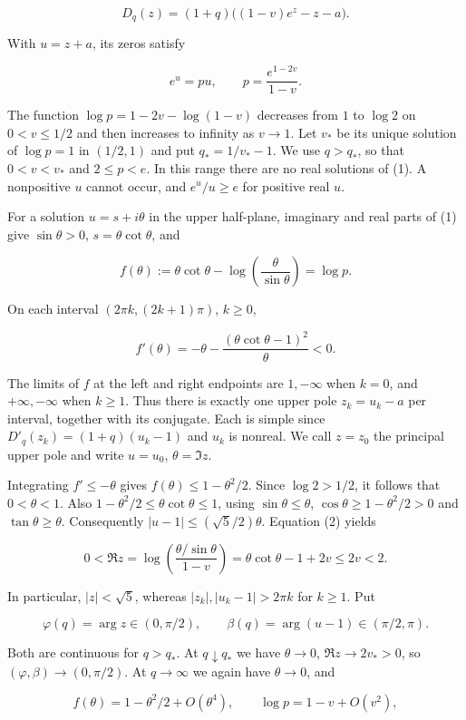 \documentclass[11pt]{article}
\begin{document}
\[
D_q(z)=(1+q)\big((1-v)e^z-z-a\big).
\]

With $u=z+a$, its zeros satisfy

\[
e^u=p u,\qquad p=\frac{e^{1-2v}}{1-v}.
\tag{1}
\]

The function $\log p=1-2v-\log(1-v)$ decreases from $1$ to $\log 2$ on $0<v\le1/2$ and then increases to infinity as $v\to1$. Let $v_*$ be its unique solution of $\log p=1$ in $(1/2,1)$ and put $q_*=1/v_*-1$. We use $q>q_*$, so that $0<v<v_*$ and $2\le p<e$. In this range there are no real solutions of (1). A nonpositive $u$ cannot occur, and $e^u/u\ge e$ for positive real $u$.

For a solution $u=s+i\theta$ in the upper half-plane, imaginary and real parts of (1) give $\sin\theta>0$, $s=\theta\cot\theta$, and

\[
f(\theta):=\theta\cot\theta-\log\left(\frac\theta{\sin\theta}\right)=\log p.
\tag{2}
\]

On each interval $(2\pi k,(2k+1)\pi)$, $k\ge0$,

\[
f'(\theta)=-\theta-\frac{(\theta\cot\theta-1)^2}{\theta}<0.
\]

The limits of $f$ at the left and right endpoints are $1,-\infty$ when $k=0$, and $+\infty,-\infty$ when $k\ge1$. Thus there is exactly one upper pole $z_k=u_k-a$ per interval, together with its conjugate. Each is simple since $D'_q(z_k)=(1+q)(u_k-1)$ and $u_k$ is nonreal. We call $z=z_0$ the principal upper pole and write $u=u_0$, $\theta=\Im z$.

Integrating $f'\le-\theta$ gives $f(\theta)\le 1-\theta^2/2$. Since $\log 2>1/2$, it follows that $0<\theta<1$. Also $1-\theta^2/2\le\theta\cot\theta\le1$, using $\sin\theta\le\theta$, $\cos\theta\ge1-\theta^2/2>0$ and $\tan\theta\ge\theta$. Consequently $|u-1|\le(\sqrt5/2)\theta$. Equation (2) yields

\[
0<\Re z=\log\left(\frac{\theta/\sin\theta}{1-v}\right)
=\theta\cot\theta-1+2v\le2v<2.
\]

In particular, $|z|<\sqrt5$, whereas $|z_k|,|u_k-1|>2\pi k$ for $k\ge1$. Put

\[
\varphi(q)=\arg z\in(0,\pi/2),\qquad \beta(q)=\arg(u-1)\in(\pi/2,\pi).
\]

Both are continuous for $q>q_*$. At $q\downarrow q_*$ we have $\theta\to0$, $\Re z\to2v_*>0$, so $(\varphi,\beta)\to(0,\pi/2)$. At $q\to\infty$ we again have $\theta\to0$, and

\[
f(\theta)=1-\theta^2/2+O(\theta^4),\qquad
\log p=1-v+O(v^2),
\]
\end{document}
